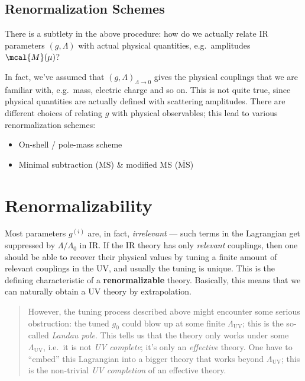 \documentclass[a4paper,10pt]{article}
\begin{document}
\subsection{Renormalization Schemes}
	
	There is a subtlety in the above procedure: how do we actually relate IR
	parameters $(g,\Lambda)$ with actual physical quantities,
	e.g.~amplitudes $\mcal{M}(\mu)$?
	
	In fact, we've assumed that $(g,\Lambda)_{\Lambda\to 0}$ gives the
	physical couplings that we are familiar with, e.g.~mass, electric charge
	and so on. This is not quite true, since physical quantities are
	actually defined with scattering amplitudes. There are different choices
	of relating $g$ with physical observables; this lead to various
	renormalization schemes:
	
	\begin{itemize}[nosep]
	
	\item
	  On-shell / pole-mass scheme
	\item
	  Minimal subtraction ($\mathrm{MS}$) \& modified MS
	  ($\overline{\mathrm{MS}}$)
	\end{itemize}
	
	\hypertarget{renormalizability}{%
	\section{Renormalizability}\label{renormalizability}}
	
	Most parameters $g^{(i)}$ are, in fact, \emph{irrelevant} --- such
	terms in the Lagrangian get suppressed by $\Lambda/\Lambda_0$ in IR.
	If the IR theory has only \emph{relevant} couplings, then one should be
	able to recover their physical values by tuning a finite amount of
	relevant couplings in the UV, and usually the tuning is unique. This is
	the defining characteristic of a \textbf{renormalizable} theory.
	Basically, this means that we can naturally obtain a UV theory by
	extrapolation.
	
	\begin{quote}
	However, the tuning process described above might encounter some serious
	obstruction: the tuned $g_0$ could blow up at some finite
	$\Lambda_{\mathrm{UV}}$; this is the so-called \emph{Landau pole}.
	This tells us that the theory only works under some
	$\Lambda_{\mathrm{UV}}$, i.e.~it is not \emph{UV complete}; it's only
	an \emph{effective} theory. One have to ``embed'' this Lagrangian into a
	bigger theory that works beyond $\Lambda_{\mathrm{UV}}$; this is the
	non-trivial \emph{UV completion} of an effective theory.
	\end{quote}
	
\end{document}
